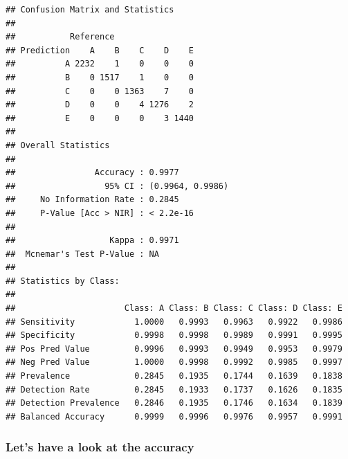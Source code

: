 \documentclass[]{article}
\newenvironment{Shaded}{\begin{snugshade}}{\end{snugshade}}
\newcommand{\KeywordTok}[1]{\textcolor[rgb]{0.13,0.29,0.53}{\textbf{{#1}}}}
\newcommand{\DataTypeTok}[1]{\textcolor[rgb]{0.13,0.29,0.53}{{#1}}}
\newcommand{\DecValTok}[1]{\textcolor[rgb]{0.00,0.00,0.81}{{#1}}}
\newcommand{\StringTok}[1]{\textcolor[rgb]{0.31,0.60,0.02}{{#1}}}
\newcommand{\NormalTok}[1]{{#1}}
\begin{document}
\begin{Shaded}
\end{Shaded}

\begin{verbatim}
## Confusion Matrix and Statistics
## 
##           Reference
## Prediction    A    B    C    D    E
##          A 2232    1    0    0    0
##          B    0 1517    1    0    0
##          C    0    0 1363    7    0
##          D    0    0    4 1276    2
##          E    0    0    0    3 1440
## 
## Overall Statistics
##                                           
##                Accuracy : 0.9977          
##                  95% CI : (0.9964, 0.9986)
##     No Information Rate : 0.2845          
##     P-Value [Acc > NIR] : < 2.2e-16       
##                                           
##                   Kappa : 0.9971          
##  Mcnemar's Test P-Value : NA              
## 
## Statistics by Class:
## 
##                      Class: A Class: B Class: C Class: D Class: E
## Sensitivity            1.0000   0.9993   0.9963   0.9922   0.9986
## Specificity            0.9998   0.9998   0.9989   0.9991   0.9995
## Pos Pred Value         0.9996   0.9993   0.9949   0.9953   0.9979
## Neg Pred Value         1.0000   0.9998   0.9992   0.9985   0.9997
## Prevalence             0.2845   0.1935   0.1744   0.1639   0.1838
## Detection Rate         0.2845   0.1933   0.1737   0.1626   0.1835
## Detection Prevalence   0.2846   0.1935   0.1746   0.1634   0.1839
## Balanced Accuracy      0.9999   0.9996   0.9976   0.9957   0.9991
\end{verbatim}

\subsubsection{Let's have a look at the
accuracy}\label{lets-have-a-look-at-the-accuracy}

\begin{Shaded}
\end{Shaded}
\end{document}
